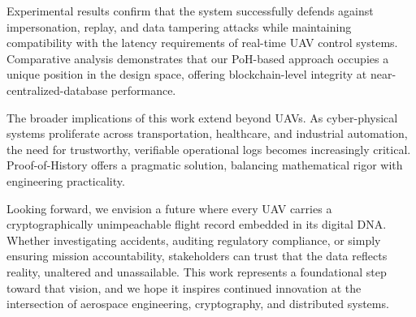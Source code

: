 \documentclass[preprint,12pt]{elsarticle}
\begin{document}
Experimental results confirm that the system successfully defends against impersonation, replay, and data tampering attacks while maintaining compatibility with the latency requirements of real-time UAV control systems. Comparative analysis demonstrates that our PoH-based approach occupies a unique position in the design space, offering blockchain-level integrity at near-centralized-database performance.

The broader implications of this work extend beyond UAVs. As cyber-physical systems proliferate across transportation, healthcare, and industrial automation, the need for trustworthy, verifiable operational logs becomes increasingly critical. Proof-of-History offers a pragmatic solution, balancing mathematical rigor with engineering practicality.

Looking forward, we envision a future where every UAV carries a cryptographically unimpeachable flight record embedded in its digital DNA. Whether investigating accidents, auditing regulatory compliance, or simply ensuring mission accountability, stakeholders can trust that the data reflects reality, unaltered and unassailable. This work represents a foundational step toward that vision, and we hope it inspires continued innovation at the intersection of aerospace engineering, cryptography, and distributed systems.






\end{document}
